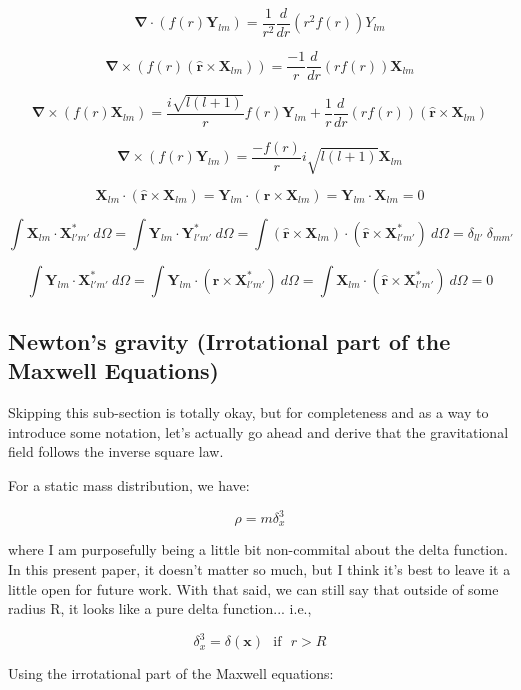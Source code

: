 \documentclass {article}
\renewcommand\vec{\mathbf}
\let\OldS\nabla
\renewcommand{\nabla}{\boldsymbol{\OldS}}
\let\OldHat\hat
\renewcommand{\hat}[1]{\OldHat{\mathbf{#1}}}
\begin{document}
$$ \nabla \cdot \left( f(r) \vec Y_{lm} \right) = \frac {1}{r^2} \frac d {dr} \left(r^2 f(r) \right) Y_{lm}$$

$$\nabla \times \left( f(r) \left( \hat r \times \vec X_{lm} \right) \right) = \frac {-1} {r} \frac d {dr} \left( r f(r) \right) \vec X_{lm}$$

$$\nabla \times \left( f(r) \vec X_{lm} \right) = \frac {i \sqrt{l(l+1)} } {r} f(r) \vec Y_{lm} + \frac 1 r \frac d {dr} \left( r f(r) \right) \left( \hat r \times \vec X_{lm} \right)$$

$$\nabla \times \left( f(r) \vec Y_{lm} \right) = \frac {- f(r)} r i \sqrt {l (l+1)} \vec X_{lm}$$

$$ \vec X_{lm} \cdot ( \hat r \times \vec X_{lm}) = \vec Y_{lm} \cdot  ( \hat r \times \vec X_{lm}) = \vec Y_{lm} \cdot \vec X_{lm} = 0$$ 

$$ \int \vec X_{lm} \cdot \vec X_{l' m'}^* ~ d \Omega  = \int \vec Y_{lm} \cdot \vec Y_{l' m'}^* ~ d \Omega  = \int ( \hat r \times \vec X_{lm}) \cdot ( \hat r \times \vec X_{l' m'}^*) ~ d \Omega  = \delta_{ll'} ~ \delta_{m m'} $$

$$\int \vec Y_{lm} \cdot \vec X_{l' m'}^* ~ d \Omega = \int \vec Y_{lm} \cdot ( \hat r \times \vec X_{l' m'}^* ) ~ d \Omega  =  \int \vec X_{lm} \cdot ( \hat r \times \vec X_{l' m'}^* ) ~ d \Omega   = 0 $$

\newpage
\subsection{Newton's gravity (Irrotational part of the Maxwell Equations)}

Skipping this sub-section is totally okay, but for completeness and as a way to introduce some notation, let's actually go ahead and derive that the gravitational field follows the inverse square law. 

For a static mass distribution, we have:

$$\rho = m \delta^3_x  $$

where I am purposefully being a little bit non-commital about the delta function. In this present paper, it doesn't matter so much, but I think it's best to leave it a little open for future work. With that said, we can still say that outside of some radius R, it looks like a pure delta function... i.e.,

$$\delta^3_x = \delta(\vec x) ~~~ \textrm{if} ~~~ r > R $$

Using the irrotational part of the Maxwell equations:
\end{document}
